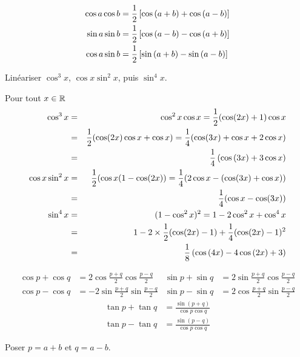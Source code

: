 \documentclass{magnolia}
\begin{document}
\begin{proposition}[utile=-3, nom={Linéarisation}]
\begin{align*}
\cos a\cos b&=\frac{1}{2}\left[\cos\left(a+b\right)+\cos\left(a-b\right)\right]\\
\sin a\sin b&=\frac{1}{2}\left[\cos\left(a-b\right)-\cos\left(a+b\right)\right]\\
\cos a\sin b&=\frac{1}{2}\left[\sin\left(a+b\right)-\sin\left(a-b\right)\right]
\end{align*}
\end{proposition}

\begin{exoUnique}
\exo Linéariser $\cos^3 x$, $\cos x\sin^2 x$, puis $\sin^4 x$.
  \begin{sol}
  Pour tout $x\in\mathbb{R}$
  \begin{eqnarray*}
  \cos^{3}x &=& \cos^{2}x \cos x = \frac{1}{2}(\cos (2x) +1)\cos x\\
            &=& \frac{1}{2}(\cos (2x)\cos x +\cos x)=\frac{1}{4}(\cos (3x)+\cos x +2\cos x)\\
            &=& \frac{1}{4}\left(\cos\left(3x\right)+3\cos x\right)\\
  \cos x\sin^2 x &=& \frac{1}{2}(\cos x(1-\cos (2x))=\frac{1}{4}(2\cos x -( \cos (3x)+\cos x))\\
                 &=& \frac{1}{4}(\cos x - \cos (3x))\\
  \sin^4 x &=& (1-\cos^{2}x)^{2}=1-2\cos^{2}x+\cos^{4}x\\
           &=& 1-2\times\frac{1}{2}(\cos (2x)-1)+\frac{1}{4}(\cos (2x)-1)^{2}\\
           &=& \frac{1}{8}\left(\cos\left(4x\right)-4\cos\left(2x\right)+3\right)
  \end{eqnarray*}
  \end{sol}
\end{exoUnique}

\begin{proposition}[utile=-3, nom={Factorisation}]
\begin{align*}
\cos p+\cos q&=2\cos\frac{p+q}{2}\cos\frac{p-q}{2} &
\sin p+\sin q&=2\sin\frac{p+q}{2}\cos\frac{p-q}{2}\\
\cos p-\cos q&=-2\sin\frac{p+q}{2}\sin\frac{p-q}{2} &
\sin p-\sin q&=2\cos\frac{p+q}{2}\sin\frac{p-q}{2}
\end{align*}
\begin{align*}
\tan p+\tan q&=\frac{\sin(p+q)}{\cos p\cos q}\\
\tan p-\tan q&=\frac{\sin(p-q)}{\cos p\cos q}
\end{align*}
\end{proposition}
\begin{preuve}
Poser $p=a+b$ et $q=a-b$.
\end{preuve}
\end{document}
